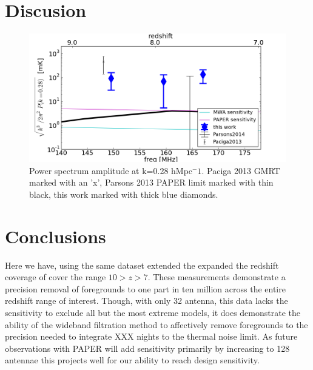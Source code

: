 \documentclass[preprint]{aastex}
\begin{document}
\section{Discusion}

\begin{figure}
\includegraphics[width=\textwidth]{figures/psa_p3k_vs_z_28.png}
\caption{Power spectrum amplitude at k=0.28 hMpc$^-1$.  Paciga 2013 GMRT marked with an 'x', Parsons 2013 PAPER limit marked with thin black, this work marked with thick blue diamonds.}
\end{figure}

\section{Conclusions}

Here we have, using the same dataset extended the expanded the redshift coverage of \cite{Parsons:2013p9876} cover the range $10>z>7$.  These measurements demonstrate a precision removal of foregrounds to one part in ten million across the entire redshift range of interest. Though, with only 32 antenna, this data lacks the sensitivity to exclude all but the most extreme models, it does demonstrate the ability of the wideband filtration method to affectively remove foregrounds to the precision needed to integrate XXX nights to the thermal noise limit.  As future observations with PAPER  will add sensitivity primarily by increasing to 128 antennae this projects well for our ability to reach design sensitivity. 
\end{document}
